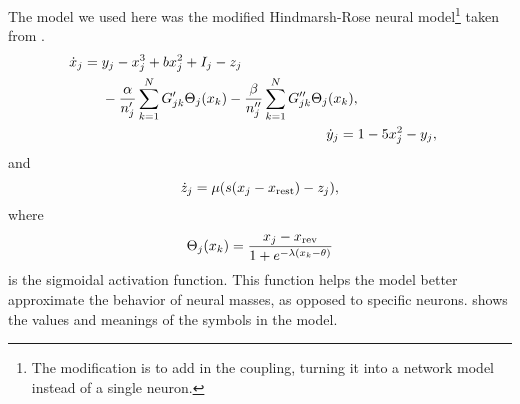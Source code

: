 The model we used here was the modified Hindmarsh-Rose neural model\footnote{The modification is to add in the coupling, turning it into a network model instead of a single neuron.} taken from \cite{Santos2017}.
\begin{align}
  \begin{split}
  \label{eq:hr_x}
  \dot{\hrx}_{j}
  ={}&
    \hry_{j}
    -
    \hrx_{j}^{3}
    +
    b \hrx_{j}^{2}
    +
    I_{j}
    -
    \hrz_{j} \\
    & -
    \frac{\hra}{n'_{j}} \sum_{k = 1}^{N} G'_{j k} \Theta_{j}(\hrx_{k})
    -
    \frac{\hrb}{n''_{j}} \sum_{k = 1}^{N} G''_{j k} \Theta_{j}(\hrx_{k}),
    \end{split} \\
  \label{eq:hr_y}
  \dot{\hry}_{j}
  ={}&
    1
    -
    5 \hrx_{j}^{2}
    -
    \hry_{j}, \\
\end{align}
and
\begin{equation}
  \label{eq:hr_z}
  \dot{\hrz}_{j}
  ={}
    \mu \pqty{s \pqty{\hrx_{j} - \hrx_{\text{rest}}} - \hrz_{j}},
\end{equation}
where
\begin{equation}
  \label{eq:hr_sigmoid}
  \Theta_{j}(\hrx_{k})
  =
  \frac{\hrx_{j} - \hrx_{\text{rev}}}{1 + e^{-\lambda \pqty{\hrx_{k} - \theta}}}
\end{equation}
is the sigmoidal activation function.
This function helps the model better approximate the behavior of neural masses, as opposed to specific neurons.
 shows the values and meanings of the symbols in the model.

